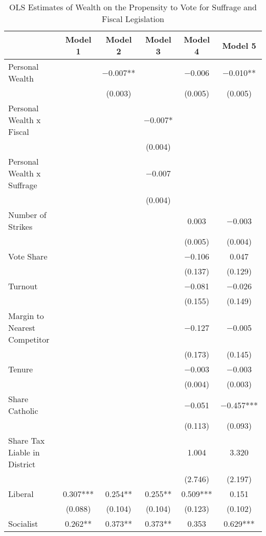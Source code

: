 \begin{table}

\caption{\label{tab:ols_pooled_lawpartyint}OLS Estimates of Wealth on the Propensity to Vote for Suffrage and Fiscal Legislation}
\centering
\begin{tabular}[t]{lccccc}
\toprule
  & Model 1 & Model 2 & Model 3 & Model 4 & Model 5\\
\midrule
Personal Wealth &  & \num{-0.007}** &  & \num{-0.006} & \num{-0.010}**\\
 &  & (\num{0.003}) &  & (\num{0.005}) & (\num{0.005})\\
Personal Wealth x Fiscal &  &  & \num{-0.007}* &  & \\
 &  &  & (\num{0.004}) &  \vphantom{1} & \\
Personal Wealth x Suffrage &  &  & \num{-0.007} &  & \\
 &  &  & (\num{0.004}) &  & \\
Number of Strikes &  &  &  & \num{0.003} & \num{-0.003}\\
 &  &  &  & (\num{0.005}) & (\num{0.004})\\
Vote Share &  &  &  & \num{-0.106} & \num{0.047}\\
 &  &  &  & (\num{0.137}) & (\num{0.129})\\
Turnout &  &  &  & \num{-0.081} & \num{-0.026}\\
 &  &  &  & (\num{0.155}) & (\num{0.149})\\
Margin to Nearest Competitor &  &  &  & \num{-0.127} & \num{-0.005}\\
 &  &  &  & (\num{0.173}) & (\num{0.145})\\
Tenure &  &  &  & \num{-0.003} & \num{-0.003}\\
 &  &  &  & (\num{0.004}) & (\num{0.003})\\
Share Catholic &  &  &  & \num{-0.051} & \num{-0.457}***\\
 &  &  &  & (\num{0.113}) & (\num{0.093})\\
Share Tax Liable in District &  &  &  & \num{1.004} & \num{3.320}\\
 &  &  &  & (\num{2.746}) & (\num{2.197})\\
Liberal & \num{0.307}*** & \num{0.254}** & \num{0.255}** & \num{0.509}*** & \num{0.151}\\
 & (\num{0.088}) & (\num{0.104}) & (\num{0.104}) & (\num{0.123}) & (\num{0.102})\\
Socialist & \num{0.262}** & \num{0.373}** & \num{0.373}** & \num{0.353} & \num{0.629}***\\

\end{tabular}
\end{table}
